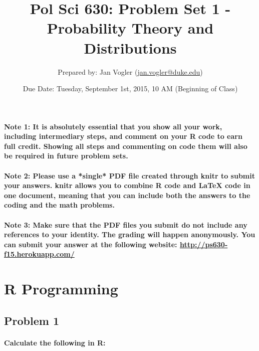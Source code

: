 \documentclass[12pt,letter]{article}
\begin{document}
\title{Pol Sci 630: Problem Set 1 - Probability Theory and Distributions}

\author{Prepared by: Jan Vogler (\href{mailto:jan.vogler@duke.edu}{jan.vogler@duke.edu})}

\date{Due Date: Tuesday, September 1st, 2015, 10 AM (Beginning of Class)}
 
\maketitle 



\paragraph{Note 1: It is absolutely essential that you show all your work, including intermediary steps, and comment on your R code to earn full credit. Showing all steps and commenting on code them will also be required in future problem sets.}

\paragraph{Note 2: Please use a *single* PDF file created through knitr to submit your answers. knitr allows you to combine R code and LaTeX code in one document, meaning that you can include both the answers to the coding and the math problems.}

\paragraph{Note 3: Make sure that the PDF files you submit do not include any references to your identity. The grading will happen anonymously. You can submit your answer at the following website: \url{http://ps630-f15.herokuapp.com/}}



\section*{R Programming}

\subsection*{Problem 1}

\paragraph{Calculate the following in R:}
\end{document}
